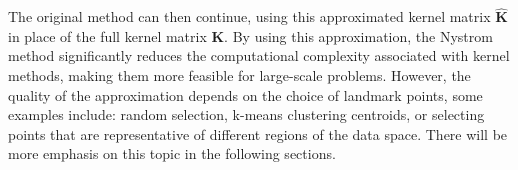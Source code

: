             The original method can then continue, using this approximated kernel matrix $\hat{\boldsymbol{K}}$ in place of the full kernel matrix $\boldsymbol{K}$. By using this approximation, the Nystrom method significantly reduces the computational complexity associated with kernel methods, making them more feasible for large-scale problems. However, the quality of the approximation depends on the choice of landmark points, some examples include: random selection, k-means clustering centroids, or selecting points that are representative of different regions of the data space. There will be more emphasis on this topic in the following sections.





